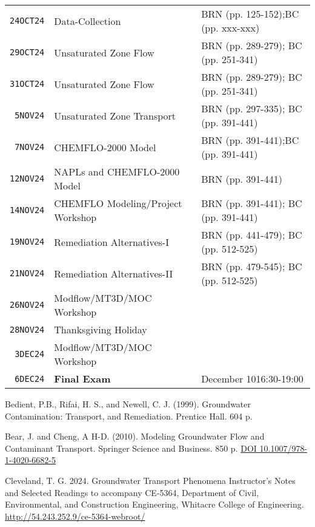 \documentclass[12pt]{article}
\begin{document}
\begin{table}[ht!]
\begin{tabular}{p{0.5in}p{3.0in}p{3.0in}}
\texttt{24OCT24} & Data-Collection  & BRN (pp. 125-152);BC (pp. xxx-xxx)\\ %
\texttt{29OCT24} & Unsaturated Zone Flow & BRN (pp. 289-279); BC (pp. 251-341)\\ %
\texttt{31OCT24} & Unsaturated Zone Flow & BRN (pp. 289-279); BC (pp. 251-341)\\ %
\texttt{~5NOV24} & Unsaturated Zone Transport & BRN (pp. 297-335); BC (pp. 391-441)  \\ %
\texttt{~7NOV24} & CHEMFLO-2000 Model & BRN (pp. 391-441);BC (pp. 391-441)  \\ %
\texttt{12NOV24} & NAPLs and CHEMFLO-2000 Model & BRN (pp. 391-441)  \\ %
\texttt{14NOV24} & CHEMFLO Modeling/Project Workshop  & BRN (pp. 391-441); BC (pp. 391-441) \\ %
\texttt{19NOV24} & Remediation Alternatives-I & BRN (pp. 441-479); BC (pp. 512-525) \\ %
\texttt{21NOV24} & Remediation Alternatives-II & BRN (pp. 479-545); BC (pp. 512-525) \\ %
\texttt{26NOV24} & Modflow/MT3D/MOC Workshop &  \\ %
\texttt{28NOV24} & Thanksgiving Holiday &    \\ %
\texttt{~3DEC24} & Modflow/MT3D/MOC Workshop &  \\ %
\texttt{~6DEC24} & \textbf{Final Exam} & December 10\@ 16:30-19:00 \\ %
\hline
   \end{tabular}
   \label{tab:fall2024schedule}
\end{table}


\clearpage



\begin{thebibliography}{}

Bedient, P.B., Rifai, H. S., and Newell, C. J. (1999). Groundwater Contamination: Transport, and Remediation. Prentice Hall. 604 p. 

Bear, J. and Cheng, A H-D. (2010). Modeling Groundwater Flow and Contaminant Transport. Springer Science and Business. 850 p. \url{DOI 10.1007/978-1-4020-6682-5}

Cleveland, T. G. 2024. Groundwater Transport Phenomena Instructor's Notes and Selected Readings to accompany CE-5364, Department of Civil, Environmental, and Construction Engineering, Whitacre College of Engineering. \url{http://54.243.252.9/ce-5364-webroot/}

\end{thebibliography}
\end{document}
